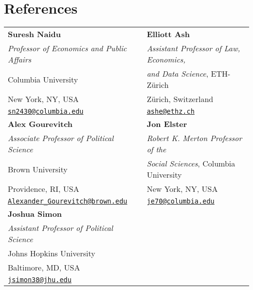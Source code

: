 \documentclass[letterpaper,11pt]{article}
\begin{document}
%
%
%


\clearpage

\section{References}

\begin{tabularx}{\textwidth}{@{}bb@{}}

		\textbf{Suresh Naidu} &  \textbf{Elliott Ash}  \\
		\textit{Professor of Economics and Public Affairs} &  \textit{Assistant Professor of Law, Economics,}  \\
		 Columbia University &   \textit{and Data Science}, ETH-Zürich  \\
		New York, NY, USA & Zürich, Switzerland \\
		\href{mailto:sn2430@columbia.edu}{\texttt{sn2430@columbia.edu}} &  \href{mailto:ashe@ethz.ch}{\texttt{ashe@ethz.ch}} \\[2ex]
		\textbf{Alex Gourevitch} &  \textbf{Jon Elster}  \\
		\textit{Associate Professor of Political Science} &  \textit{Robert K. Merton Professor of the}  \\
		 Brown University &   \textit{Social Sciences}, Columbia University  \\
		Providence, RI, USA & New York, NY, USA \\
		\href{mailto:Alexander_Gourevitch@brown.edu}{\texttt{Alexander\_Gourevitch@brown.edu}} &  \href{mailto:je70@columbia.edu}{\texttt{je70@columbia.edu}} \\[2ex]
		\textbf{Joshua Simon} &  \\
		\textit{Assistant Professor of Political Science} &  \\
		 Johns Hopkins University &  \\
		Baltimore, MD, USA &  \\
		\href{mailto:jsimon38@jhu.edu}{\texttt{jsimon38@jhu.edu}} &  \\[2ex]
	
\end{tabularx}
\end{document}
